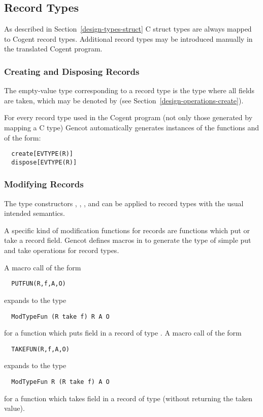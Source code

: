 \subsection{Record Types}
\label{design-operations-record}

As described in Section~\ref{design-types-struct} C struct types are always mapped to Cogent record types.
Additional record types may be introduced manually in the translated Cogent program.

\subsubsection{Creating and Disposing Records}

The empty-value type corresponding to a record type  is the type  where all fields are taken,
which may be denoted by  (see Section~\ref{design-operations-create}).

For every record type  used in the Cogent program (not only those generated by mapping a C type) Gencot automatically
generates instances of the functions  and  of the form:
\begin{verbatim}
  create[EVTYPE(R)]
  dispose[EVTYPE(R)]
\end{verbatim}

\subsubsection{Modifying Records}

The type constructors , , , and  can be applied to record types with the 
usual intended semantics. 

A specific kind of modification functions for records are functions which put or take a record field. 
Gencot defines macros in  to generate the type of simple put and take operations for
record types.

A macro call of the form 
\begin{verbatim}
  PUTFUN(R,f,A,O)
\end{verbatim}
expands to the type
\begin{verbatim}
  ModTypeFun (R take f) R A O
\end{verbatim}
for a function which puts field  in a record of type . A macro call of the form
\begin{verbatim}
  TAKEFUN(R,f,A,O)
\end{verbatim}
expands to the type
\begin{verbatim}
  ModTypeFun R (R take f) A O
\end{verbatim}
for a function which takes field  in a record of type  (without returning the taken value).

